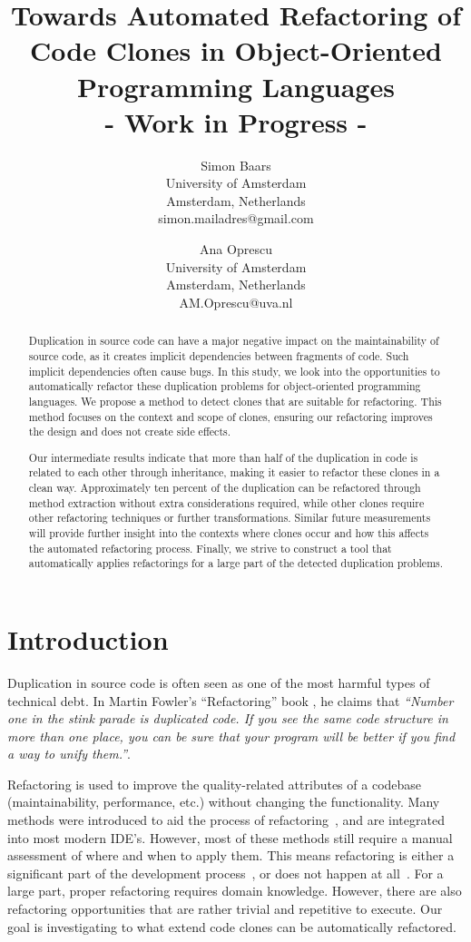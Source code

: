 \documentclass[a4paper]{article}
\title{Towards Automated Refactoring of Code Clones in Object-Oriented Programming Languages\\- Work in Progress -}
\author{
Simon Baars \\ University of Amsterdam\\
                Amsterdam, Netherlands \\ simon.mailadres@gmail.com
\and
Ana Oprescu \\ University of Amsterdam\\
                Amsterdam, Netherlands \\
                AM.Oprescu@uva.nl
}
\begin{document}
\maketitle

\begin{abstract}
Duplication in source code can have a major negative impact on the maintainability of source code, as it creates implicit dependencies between fragments of code. Such implicit dependencies often cause bugs. In this study, we look into the opportunities to automatically refactor these duplication problems for object-oriented programming languages. We propose a method to detect clones that are suitable for refactoring. This method focuses on the context and scope of clones, ensuring our refactoring improves the design and does not create side effects.

Our intermediate results indicate that more than half of the duplication in code is related to each other through inheritance, making it easier to refactor these clones in a clean way. Approximately ten percent of the duplication can be refactored through method extraction without extra considerations required, while other clones require other refactoring techniques or further transformations. Similar future measurements will provide further insight into the contexts where clones occur and how this affects the automated refactoring process. Finally, we strive to construct a tool that automatically applies refactorings for a large part of the detected duplication problems.
\end{abstract}

\section{Introduction}
Duplication in source code is often seen as one of the most harmful types of technical debt. In Martin Fowler's ``Refactoring'' book \cite{fowler1999refactoring}, he claims that \textit{``Number one in the stink parade is duplicated code. If you see the same code structure in more than one place, you can be sure that your program will be better if you find a way to unify them.''}.

Refactoring is used to improve the quality-related attributes of a codebase (maintainability, performance, etc.) without changing the functionality. Many methods were introduced to aid the process of refactoring~\cite{fowler1999refactoring, wake2004refactoring}, and are integrated into most modern IDE's. However, most of these methods still require a manual assessment of where and when to apply them. This means refactoring is either a significant part of the development process~\cite{lientz1978characteristics, mens2004survey}, or does not happen at all~\cite{mens2003refactoring}. For a large part, proper refactoring requires domain knowledge. However, there are also refactoring opportunities that are rather trivial and repetitive to execute. Our goal is investigating to what extend code clones can be automatically refactored.
\end{document}
